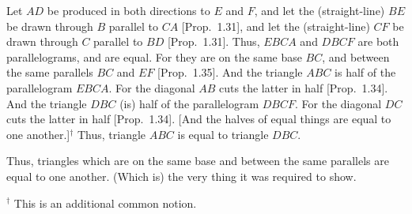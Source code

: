 \begin{Parallel}{}{}
{Let $AD$ be produced in both directions to $E$ and $F$, and let the
(straight-line) $BE$ be drawn through $B$ parallel to $CA$ [Prop.~1.31],
and let the (straight-line) $CF$ be drawn through $C$ parallel to
$BD$ [Prop.~1.31]. Thus, $EBCA$ and $DBCF$ are both parallelograms,
and are equal. For they are on the same base $BC$, and between
the same parallels $BC$ and $EF$ [Prop.~1.35]. And the triangle $ABC$ is
half of 
the parallelogram
$EBCA$. For the diagonal $AB$ cuts the latter in half [Prop.~1.34]. And the 
triangle $DBC$ (is) half of the parallelogram $DBCF$. For the diagonal
$DC$ cuts the latter in half [Prop.~1.34]. [And the halves of equal things are
equal to one another.]$^\dag$
Thus, triangle $ABC$ is equal to triangle $DBC$.

Thus, triangles which are on the same base and between the same parallels
are equal to one another. (Which is) the very thing it was required to show.}
\end{Parallel}
{\footnotesize \noindent$^\dag$ This is an additional common notion.}


